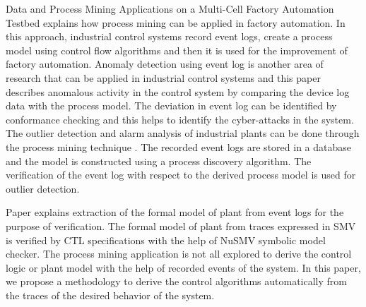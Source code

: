 \begin{bibunit}
Data and Process Mining Applications on a Multi-Cell Factory Automation Testbed \cite{paper1} explains how process mining can be applied in factory automation. In this approach, industrial control systems record event logs, create a process model using control flow algorithms and then it is used for the improvement of factory automation. Anomaly detection using event log is another area of research that can be applied in industrial control systems and this paper \cite{paper2} describes anomalous activity in the control system by comparing the device log data with the process model. The deviation in event log can be identified by conformance checking and this helps to identify the cyber-attacks in the system. The outlier detection and alarm analysis of industrial plants can be done through the process mining technique \cite{paper3}. The recorded event logs are stored in a database and the model is constructed using a process discovery algorithm. The verification of the event log with respect to the derived process model is used for outlier detection.

Paper \cite{xavier2021plant} explains extraction of the formal model of plant from event logs for the purpose of verification. The formal model of plant from traces expressed in SMV is verified by CTL specifications with the help of NuSMV symbolic model checker. The process mining application is not all explored to derive the control logic or plant model  with the help of recorded events of the system. In this paper, we propose a methodology to derive the control algorithms automatically from the traces of the desired behavior of the system.

\end{bibunit}
